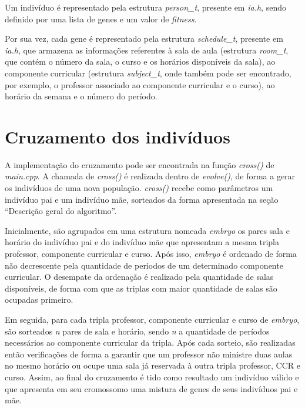 \documentclass[12pt]{article}
\begin{document}
Um indivíduo é representado pela estrutura \emph{person\_t}, presente em \emph{ia.h}, sendo definido por uma lista de genes e um valor de \textit{fitness}.

Por sua vez, cada gene é representado pela estrutura \emph{schedule\_t}, presente em \emph{ia.h}, que armazena as informações referentes à sala de aula (estrutura \emph{room\_t}, que contém o número da sala, o curso e os horários disponíveis da sala), ao componente curricular (estrutura \emph{subject\_t}, onde também pode ser encontrado, por exemplo, o professor associado ao componente curricular e o curso), ao horário da semana e o número do período.

\section{Cruzamento dos indivíduos}

A implementação do cruzamento pode ser encontrada na função \emph{cross()} de \emph{main.cpp}. A chamada de \emph{cross()} é realizada dentro de \emph{evolve()}, de forma a gerar os indivíduos de uma nova população. \emph{cross()} recebe como parâmetros um indivíduo pai e um indivíduo mãe, sorteados da forma apresentada na seção ``Descrição geral do algoritmo''.

Inicialmente, são agrupados em uma estrutura nomeada \emph{embryo} os pares sala e horário do indivíduo pai e do indivíduo mãe que apresentam a mesma tripla professor, componente curricular e curso. Após isso, \emph{embryo} é ordenado de forma não decrescente pela quantidade de períodos de um determinado componente curricular. O desempate da ordenação é realizado pela quantidade de salas disponíveis, de forma com que as triplas com maior quantidade de salas são ocupadas primeiro.

Em seguida, para cada tripla professor, componente curricular e curso de \emph{embryo}, são sorteados \textit{n} pares de sala e horário, sendo \textit{n} a quantidade de períodos necessários ao componente curricular da tripla. Após cada sorteio, são realizadas então verificações de forma a garantir que um professor não ministre duas aulas no mesmo horário ou ocupe uma sala já reservada à outra tripla professor, CCR e curso. Assim, ao final do cruzamento é tido como resultado um indivíduo válido e que apresenta em seu cromossomo uma mistura de genes de seus indivíduos pai e mãe.
\end{document}
